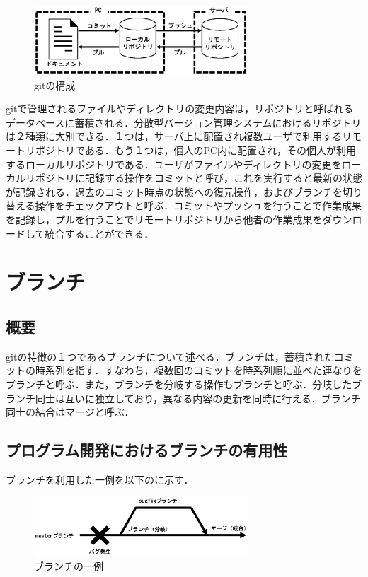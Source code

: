 \documentclass[a4j,9pt,twocolumn]{jsarticle}
\begin{document}
\begin{figure}[h]
\centering
\includegraphics[width=80mm]{img/git.eps}
\caption{gitの構成}
\label{git}
\end{figure}

gitで管理されるファイルやディレクトリの変更内容は，リポジトリと呼ばれるデータベースに蓄積される．分散型バージョン管理システムにおけるリポジトリは２種類に大別できる．１つは，サーバ上に配置され複数ユーザで利用するリモートリポジトリである．もう１つは，個人のPC内に配置され，その個人が利用するローカルリポジトリである．ユーザがファイルやディレクトリの変更をローカルリポジトリに記録する操作をコミットと呼び，これを実行すると最新の状態が記録される．過去のコミット時点の状態への復元操作，およびブランチを切り替える操作をチェックアウトと呼ぶ．コミットやプッシュを行うことで作業成果を記録し，プルを行うことでリモートリポジトリから他者の作業成果をダウンロードして統合することができる．

\section{ブランチ}
\subsection{概要}
gitの特徴の１つであるブランチについて述べる．ブランチは，蓄積されたコミットの時系列を指す．すなわち，複数回のコミットを時系列順に並べた連なりをブランチと呼ぶ．また，ブランチを分岐する操作もブランチと呼ぶ．分岐したブランチ同士は互いに独立しており，異なる内容の更新を同時に行える．ブランチ同士の結合はマージと呼ぶ．

\subsection{プログラム開発におけるブランチの有用性}
ブランチを利用した一例を以下のに示す．

\begin{figure}[h]
\centering
\includegraphics[width=80mm]{img/branch.eps}
\caption{ブランチの一例}
\label{branch_ex}
\end{figure}
\end{document}
